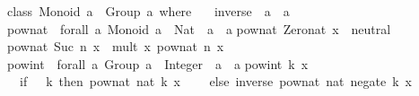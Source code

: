 \begin{isabellebody}
\begin{isamarkuptext}
\isanewline
class\ {}Monoid\ a{}\ {}{}\ Group\ a\ where\ {}\isanewline
\ \ inverse\ {}{}\ a\ {}{}\ a{}\isanewline
{}{}\isanewline
\isanewline
pow{}nat\ {}{}\ forall\ a{}\ {}Monoid\ a{}\ {}{}\ Nat\ {}{}\ a\ {}{}\ a{}\isanewline
pow{}nat\ Zero{}nat\ x\ {}\ neutral{}\isanewline
pow{}nat\ {}Suc\ n{}\ x\ {}\ mult\ x\ {}pow{}nat\ n\ x{}{}\isanewline
\isanewline
pow{}int\ {}{}\ forall\ a{}\ {}Group\ a{}\ {}{}\ Integer\ {}{}\ a\ {}{}\ a{}\isanewline
pow{}int\ k\ x\ {}\isanewline
\ \ {}if\ {}\ {}{}\ k\ then\ pow{}nat\ {}nat\ k{}\ x\isanewline
\ \ \ \ else\ inverse\ {}pow{}nat\ {}nat\ {}negate\ k{}{}\ x{}{}{}\isanewline

\end{isamarkuptext}
\end{isabellebody}
